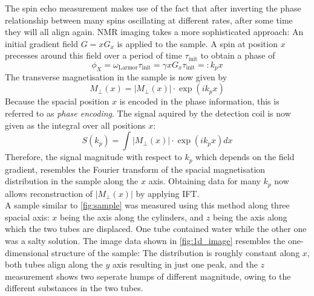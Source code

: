 \documentclass[
    parskip=half, 
    twoside=false,
    twocolumn=true,
    fontsize=11pt,
]{scrarticle}
\begin{document}
The spin echo measurement makes use of the fact that after inverting the phase relationship between many spins oscillating at different rates, after some time they will all align again. NMR imaging takes a more sophisticated approach: An initial gradient field $G = x G_x$ is applied to the sample. A spin at position $x$ precesses around this field over a period of time $\tau_\text{init}$ to obtain a phase of
\begin{equation*}
 \phi_X = \omega_\text{Larmor} \tau_\text{init} = \gamma x G_x \tau_\text{init} =: k_p x
\end{equation*}
The transverse magnetisation in the sample is now given by
\begin{equation*}
 M_\bot(x) = |M_\bot(x)|\cdot \exp(i k_p x)
\end{equation*}
Because the spacial position $x$ is encoded in the phase information, this is referred to as \textit{phase encoding}. The signal aquired by the detection coil is now given as the integral over all positions $x$:
\begin{equation}
\label{eq:1d_imag}
 S(k_p) = \int |M_\bot(x)| \cdot \exp(i k_p x) dx
\end{equation}
Therefore, the signal magnitude with respect to $k_p$ which depends on the field gradient, resembles the Fourier transform of the spacial magnetisation distribution in the sample along the $x$ axis. Obtaining data for many $k_p$ now allows reconstruction of $|M_\bot(x)|$ by applying IFT.\\

A sample similar to \autoref{fig:sample} was measured using this method along three spacial axis: $x$ being the axis along the cylinders, and $z$ being the axis along which the two tubes are displaced. One tube contained water while the other one was a salty solution. The image data shown in \autoref{fig:1d_image} resembles the one-dimensional structure of the sample: The distribution is roughly constant along $x$, both tubes align along the $y$ axis resulting in just one peak, and the $z$ measurement shows two seperate humps of different magnitude, owing to the different substances in the two tubes.
\end{document}
